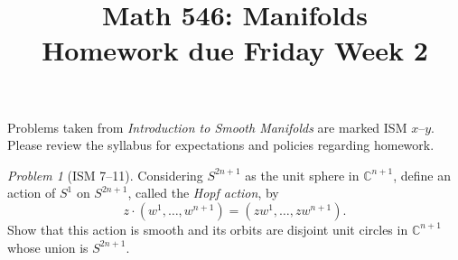 \documentclass[11pt,twoside]{amsart}
\title{Math 546: Manifolds\\ Homework due Friday Week 2}
\theoremstyle{plain}
\theoremstyle{remark}
\newtheorem{prob}{Problem}
\theoremstyle{definition}
\theoremstyle{definition}
\newcommand{\CC}{\mathbb{C}}
\newcommand{\id}{\operatorname{id}}
\newcommand{\SU}{\mathrm{SU}}
\newcommand{\SO}{\mathrm{SO}}
\renewcommand{\O}{\mathrm{O}}
\begin{document}
\maketitle

\noindent Problems taken from \emph{Introduction to Smooth Manifolds} are marked ISM $x$--$y$. Please review the syllabus for expectations and policies regarding homework.

\begin{prob}[ISM 7--11]
Considering $S^{2n+1}$ as the unit sphere in $\CC^{n+1}$, define an action of $S^1$ on $S^{2n+1}$, called the \emph{Hopf action}, by
\[
  z\cdot (w^1,\ldots,w^{n+1}) = (zw^1,\ldots,zw^{n+1}).
\]
Show that this action is smooth and its orbits are disjoint unit circles in $\CC^{n+1}$ whose union is $S^{2n+1}$.
\end{prob}


\end{document}
